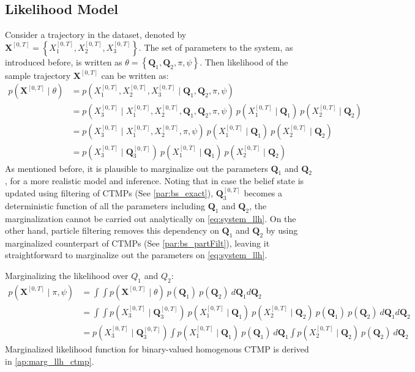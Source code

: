 \subsection{Likelihood Model}
Consider a trajectory in the dataset, denoted by $ \textbf{X}^{[0,T]} = \left\lbrace X_1^{[0,T]} , X_2^{[0,T]}, X_3^{[0,T]}\right\rbrace $. The set of parameters to the system, as introduced before, is written as $  \theta = \left\lbrace  \textbf{Q}_{1}, \textbf{Q}_{2}, \pi, \psi \right\rbrace $. Then likelihood of the sample trajectory $ \textbf{X}^{[0,T]} $ can be written as:
\begin{align}
p(\textbf{X}^{[0,T]} \mid \theta ) & = p(X_{1}^{[0, T]}, X_{2}^{[0, T]}, X_{3}^{[0, T]} \mid \textbf{Q}_{1}, \textbf{Q}_{2}, \pi, \psi) \nonumber\\
& = p(X_{3}^{[0, T]} \mid X_{1}^{[0, T]}, X_{2}^{[0, T]}, \textbf{Q}_{1}, \textbf{Q}_{2}, \pi, \psi) \ p(X_{1}^{[0, T]}\mid \textbf{Q}_{1}) \ p(X_{2}^{[0, T]}\mid \textbf{Q}_{2}) \nonumber\\ & = p(X_{3}^{[0, T]} \mid X_{1}^{[0, T]}, X_{2}^{[0, T]}, \pi, \psi) \ p(X_{1}^{[0, T]}\mid \textbf{Q}_{1}) \ p(X_{2}^{[0, T]}\mid \textbf{Q}_{2}) \nonumber\\ & = p(X_{3}^{[0, T]}\mid \textbf{Q}_{3}^{[0, T]}) \ p(X_{1}^{[0, T]}\mid \textbf{Q}_{1}) \ p(X_{2}^{[0, T]}\mid \textbf{Q}_{2}) 
\label{eq:system_llh}
\end{align}
As mentioned before, it is plausible to marginalize out the parameters $ \textbf{Q}_1 $ and $ \textbf{Q}_2 $, for a more realistic model and inference. Noting that in case the belief state is updated using filtering of CTMPs (See \cref{par:bs_exact}), $ \textbf{Q}_{3}^{[0, T]} $ becomes a deterministic function of all the parameters including $ \textbf{Q}_1 $ and $ \textbf{Q}_2 $, the marginalization cannot be carried out analytically on \autoref{eq:system_llh}. On the other hand, particle filtering removes this dependency on $ \textbf{Q}_1 $ and $ \textbf{Q}_2 $ by using marginalized counterpart of CTMPs (See \cref{par:bs_partFilt}), leaving it straightforward to marginalize out the parameters on \autoref{eq:system_llh}.

Marginalizing the likelihood over $ Q_{1} $ and $ Q_{2} $:
\begin{align}
p(\textbf{X}^{[0,T]} \mid \pi, \psi ) & = 	\int \int p(\textbf{X}^{[0,T]} \mid \theta ) \ p(\textbf{Q}_{1}) \ p(\textbf{Q}_{2}) \ d\textbf{Q}_{1}d\textbf{Q}_{2} \nonumber\\ 
& = \int \int p(X_{3}^{[0, T]}\mid \textbf{Q}_{3}^{[0, T]}) \ p(X_{1}^{[0, T]}\mid \textbf{Q}_{1}) \ p(X_{2}^{[0, T]}\mid \textbf{Q}_{2}) \ p(\textbf{Q}_{1}) \ p(\textbf{Q}_{2})\ d\textbf{Q}_{1}d\textbf{Q}_{2} \nonumber\\ 
& = p(X_{3}^{[0, T]}\mid \textbf{Q}_{3}^{[0, T]}) \int  p(X_{1}^{[0, T]}\mid \textbf{Q}_{1}) \ p(\textbf{Q}_{1}) \ d\textbf{Q}_{1} \int p(X_{2}^{[0, T]}\mid \textbf{Q}_{2})\ p(\textbf{Q}_{2})\ d\textbf{Q}_{2}
\label{eq:Marg_llh}
\end{align}
Marginalized likelihood function for binary-valued homogenous CTMP is derived in \autoref{ap:marg_llh_ctmp}.

